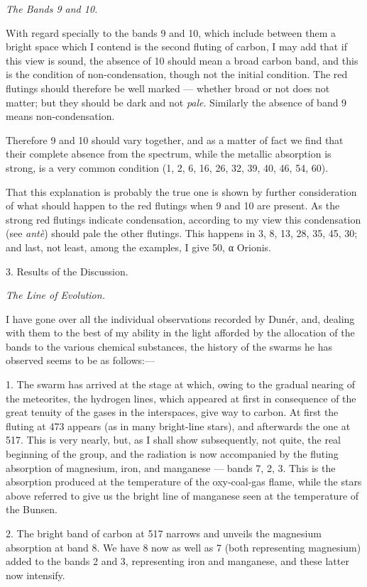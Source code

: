 \documentclass[a4paper, 12pt, oneside, polutonikogreek, english]{article}
\begin{document}
\emph{The Bands 9 and 10.}

With regard specially to the bands 9 and 10, which include between them a bright space which I contend is the second fluting of carbon, I may add that if this view is sound, the absence of 10 should mean a broad carbon band, and this is the condition of non-condensation, though not the initial condition. The red flutings should therefore be well marked --- whether broad or not does not matter; but they should be dark and not \emph{pale}. Similarly the absence of band 9 means non-condensation.

Therefore 9 and 10 should vary together, and as a matter of fact we find that their complete absence from the spectrum, while the metallic absorption is strong, is a very common condition (1, 2, 6, 16, 26, 32, 39, 40, 46, 54, 60).

That this explanation is probably the true one is shown by further consideration of what should happen to the red flutings when 9 and 10 are present. As the strong red flutings indicate condensation, according to my view this condensation (see \emph{antè}) should pale the other flutings. This happens in 3, 8, 13, 28, 35, 45, 30; and last, not least, among the examples, I give 50, α Orionis.

3. Results of the Discussion.

\emph{The Line of Evolution.}

I have gone over all the individual observations recorded by Dunér, and, dealing with them to the best of my ability in the light afforded by the allocation of the bands to the various chemical substances, the history of the swarms he has observed seems to be as follows:---

1. The swarm has arrived at the stage at which, owing to the gradual nearing of the meteorites, the hydrogen lines, which appeared at first in consequence of the great tenuity of the gases in the interspaces, give way to carbon. At first the fluting at 473 appears (as in many bright-line stars), and afterwards the one at 517. This is very nearly, but, as I shall show subsequently, not quite, the real beginning of the group, and the radiation is now accompanied by the fluting absorption of magnesium, iron, and manganese --- bands 7, 2, 3. This is the absorption produced at the temperature of the oxy-coal-gas flame, while the stars above referred to give us the bright line of manganese seen at the temperature of the Bunsen.

2. The bright band of carbon at 517 narrows and unveils the magnesium absorption at band 8. We have 8 now as well as 7 (both representing magnesium) added to the bands 2 and 3, representing iron and manganese, and these latter now intensify.
\end{document}
